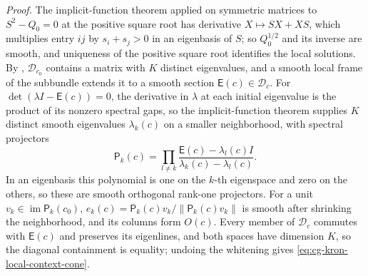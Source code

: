 \noindent\emph{Proof.}
The implicit-function theorem applied on symmetric matrices to \(S^2-Q_0=0\) at the positive square
root has derivative \(X\mapsto SX+XS\), which multiplies entry \(ij\) by \(s_i+s_j>0\) in an
eigenbasis of \(S\); so \(Q_0^{1/2}\) and its inverse are smooth, and uniqueness of the positive
square root identifies the local solutions. By ,
\(\mathscr D_{c_0}\) contains a matrix with \(K\) distinct eigenvalues, and a smooth local frame of
the subbundle extends it to a smooth section \(\mathsf E(c)\in\mathscr D_c\). For
\(\det(\lambda I-\mathsf E(c))=0\), the derivative in \(\lambda\) at each initial eigenvalue is the
product of its nonzero spectral gaps, so the implicit-function theorem supplies \(K\) distinct smooth
eigenvalues \(\lambda_k(c)\) on a smaller neighborhood, with spectral projectors
\begin{equation}
\mathsf P_k(c)=\prod_{l\ne k}
\frac{\mathsf E(c)-\lambda_l(c)I}{\lambda_k(c)-\lambda_l(c)}.
\label{eq:cg-kron-smooth-projectors}
\end{equation}
In an eigenbasis this polynomial is one on the \(k\)-th eigenspace and zero on the others, so these
are smooth orthogonal rank-one projectors. For a unit \(v_k\in\operatorname{im}\mathsf P_k(c_0)\),
\(e_k(c)=\mathsf P_k(c)v_k/\lVert\mathsf P_k(c)v_k\rVert\) is smooth after shrinking the
neighborhood, and its columns form \(O(c)\). Every member of \(\mathscr D_c\) commutes with
\(\mathsf E(c)\) and preserves its eigenlines, and both spaces have dimension \(K\), so the diagonal
containment is equality; undoing the whitening gives \eqref{eq:cg-kron-local-context-cone}.

